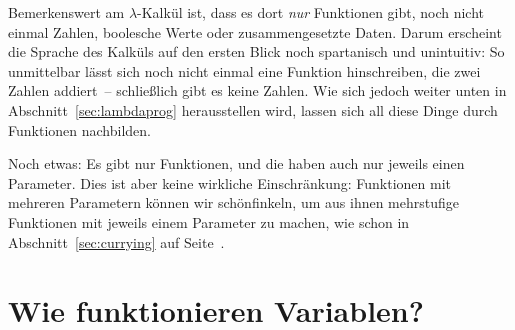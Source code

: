 Bemerkenswert am $\lambda$-Kalkül ist, dass es dort \emph{nur}
Funktionen gibt, noch nicht einmal Zahlen, boolesche Werte oder
zusammengesetzte Daten.  Darum erscheint die Sprache des Kalküls auf den
ersten Blick noch spartanisch und unintuitiv: So unmittelbar lässt sich
noch nicht einmal eine Funktion hinschreiben, die zwei Zahlen addiert~--
schließlich gibt es keine Zahlen.  Wie sich jedoch weiter unten in
Abschnitt~\ref{sec:lambdaprog} herausstellen wird, lassen sich all diese
Dinge durch Funktionen nachbilden.

Noch etwas: Es gibt nur Funktionen, und die haben auch nur jeweils
einen Parameter.  Dies ist aber keine wirkliche Einschränkung:
Funktionen mit mehreren Parametern können wir
schönfinkeln, um aus ihnen mehrstufige
Funktionen mit jeweils einem Parameter zu machen, wie schon in
Abschnitt~\ref{sec:currying} auf Seite~\pageref{sec:currying}.

\section{Wie funktionieren Variablen?}

